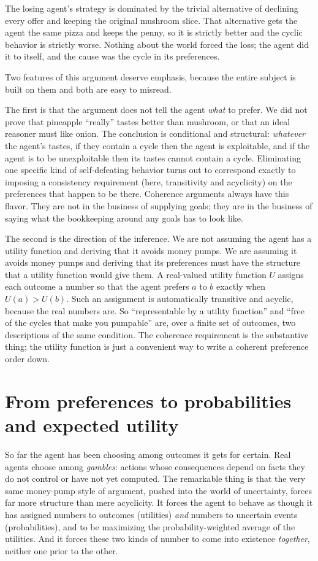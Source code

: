 \documentclass[10pt]{article}
\theoremstyle{definition}
\theoremstyle{remark}
\begin{document}
The losing agent's strategy is dominated by the trivial alternative of declining every offer and keeping the original mushroom slice. That alternative gets the agent the same pizza and keeps the penny, so it is strictly better and the cyclic behavior is strictly worse. Nothing about the world forced the loss; the agent did it to itself, and the cause was the cycle in its preferences.

Two features of this argument deserve emphasis, because the entire subject is built on them and both are easy to misread.

The first is that the argument does not tell the agent \emph{what} to prefer. We did not prove that pineapple ``really'' tastes better than mushroom, or that an ideal reasoner must like onion. The conclusion is conditional and structural: \emph{whatever} the agent's tastes, if they contain a cycle then the agent is exploitable, and if the agent is to be unexploitable then its tastes cannot contain a cycle. Eliminating one specific kind of self-defeating behavior turns out to correspond exactly to imposing a consistency requirement (here, transitivity and acyclicity) on the preferences that happen to be there. Coherence arguments always have this flavor. They are not in the business of supplying goals; they are in the business of saying what the bookkeeping around any goals has to look like.

The second is the direction of the inference. We are not assuming the agent has a utility function and deriving that it avoids money pumps. We are assuming it avoids money pumps and deriving that its preferences must have the structure that a utility function would give them. A real-valued utility function $U$ assigns each outcome a number so that the agent prefers $a$ to $b$ exactly when $U(a) > U(b)$. Such an assignment is automatically transitive and acyclic, because the real numbers are. So ``representable by a utility function'' and ``free of the cycles that make you pumpable'' are, over a finite set of outcomes, two descriptions of the same condition. The coherence requirement is the substantive thing; the utility function is just a convenient way to write a coherent preference order down.

\section{From preferences to probabilities and expected utility}
\label{sec:probabilities}

So far the agent has been choosing among outcomes it gets for certain. Real agents choose among \emph{gambles}: actions whose consequences depend on facts they do not control or have not yet computed. The remarkable thing is that the very same money-pump style of argument, pushed into the world of uncertainty, forces far more structure than mere acyclicity. It forces the agent to behave as though it has assigned numbers to outcomes (utilities) \emph{and} numbers to uncertain events (probabilities), and to be maximizing the probability-weighted average of the utilities. And it forces these two kinds of number to come into existence \emph{together}, neither one prior to the other.
\end{document}
